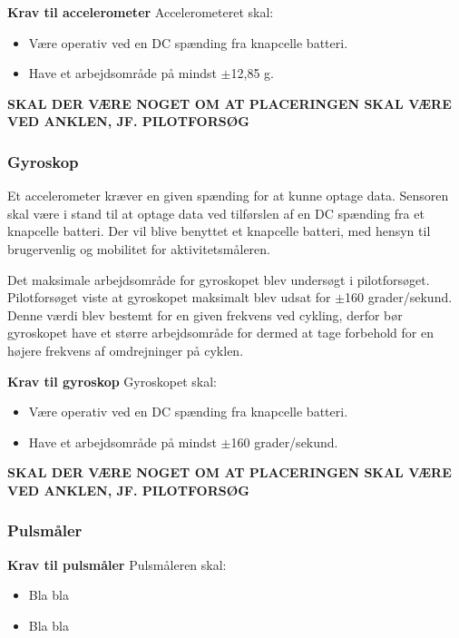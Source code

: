 \textbf{Krav til accelerometer} \newline 
Accelerometeret skal:
\begin{itemize}
\item Være operativ ved en DC spænding fra knapcelle batteri.
\item Have et arbejdsområde på mindst $\pm$12,85 g.
\end{itemize}

\textbf{SKAL DER VÆRE NOGET OM AT PLACERINGEN SKAL VÆRE VED ANKLEN, JF. PILOTFORSØG}

\subsubsection{Gyroskop} 
Et accelerometer kræver en given spænding for at kunne optage data. Sensoren skal være i stand til at optage data ved tilførslen af en DC spænding fra et knapcelle batteri. Der vil blive benyttet et knapcelle batteri, med hensyn til brugervenlig og mobilitet for aktivitetsmåleren.\newline

Det maksimale arbejdsområde for gyroskopet blev undersøgt i pilotforsøget. Pilotforsøget viste at gyroskopet maksimalt blev udsat for $\pm$160 grader/sekund. Denne værdi blev bestemt for en given frekvens ved cykling, derfor bør gyroskopet have et større arbejdsområde for dermed at tage forbehold for en højere frekvens af omdrejninger på cyklen. 


\textbf{Krav til gyroskop} \newline
Gyroskopet skal:
\begin{itemize}
\item Være operativ ved en DC spænding fra knapcelle batteri.
\item Have et arbejdsområde på mindst $\pm$160 grader/sekund.
\end{itemize}

\textbf{SKAL DER VÆRE NOGET OM AT PLACERINGEN SKAL VÆRE VED ANKLEN, JF. PILOTFORSØG}

\subsubsection{Pulsmåler}

\textbf{Krav til pulsmåler} \newline
Pulsmåleren skal:
\begin{itemize}
\item Bla bla
\item Bla bla
\end{itemize}

